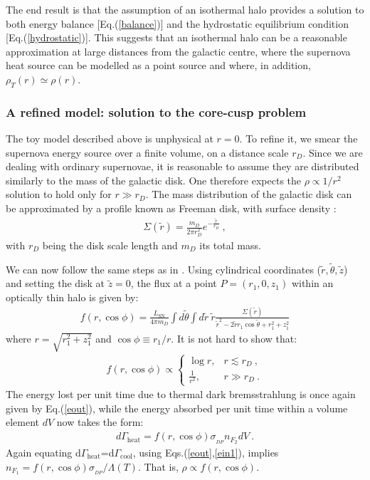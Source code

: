 \documentclass[12pt]{article}
\begin{document}
{{The end result is that the assumption of an isothermal halo provides a
solution to both energy balance [Eq.(\ref{balance})] and the hydrostatic
equilibrium condition [Eq.(\ref{hydrostatic})]. This suggests that an
isothermal halo can be a reasonable approximation at large distances
from the galactic centre, where the supernova heat source can be
modelled as a point source and where, in addition, $\rho _T (r) \simeq
\rho (r)$.

\subsubsection{A refined model: solution to the core-cusp problem}

The toy model described above is unphysical at $r = 0$. To refine it, we
smear the supernova energy source over a finite volume, on a distance
scale $r_D$. Since we are dealing with ordinary supernovae, it is
reasonable to assume they are distributed similarly to the mass of the
galactic disk. One therefore expects the $\rho \propto 1/r ^2$ solution
to hold only for $r \gg r _D$. The mass distribution of the galactic
disk can be approximated by a profile known as Freeman disk, with
surface density \cite{freeman}:
%
\begin{eqnarray}
\Sigma (\widetilde{r}) = \frac{m _D}{2\pi r_D ^2}e
^{-\frac{\widetilde{r}}{r_D}} \ ,
\end{eqnarray}
%
with $r_D$ being the disk scale length and $m _D$ its total mass. 

We can now follow the same steps as in \cite{review}. Using cylindrical
coordinates ($\widetilde{r},\widetilde{\theta},\widetilde{z}$) and
setting the disk at $\widetilde{z} = 0$, the flux at a point $P = (r
_1,0,z _1)$ within an optically thin halo is given by:
%
\begin{eqnarray}
f(r,\cos \phi ) = \frac{L _{\text{SN}}}{4\pi m _D} \int
d\widetilde{\theta} \int d\widetilde{r} \ \widetilde{r} \frac{\Sigma
(\widetilde{r})}{{\widetilde{r}} ^2 - 2\widetilde{r}r _1 \cos
\widetilde{\theta} + r _1 ^2 + z _1 ^2}
\end{eqnarray}
%
where $r = \sqrt{r _1 ^2 + z _1 ^2}$ and $\cos \phi \equiv r _1/r$. It
is not hard to show that:
%
\begin{eqnarray}
f(r,\cos \phi) \propto \begin{cases}
                  \log r, & r \lesssim r_D \ , \\
                  \frac{1}{r ^2}, & r \gg r_D \ .
                  \end{cases}
\label{frc}
\end{eqnarray}
%
The energy lost per unit time due to thermal dark bremsstrahlung is once
again given by Eq.(\ref{eout}), while the energy absorbed per unit time
within a volume element $dV$ now takes the form:
%
\begin{eqnarray}
d\Gamma _{\text{heat}} = f(r,\cos \phi)\sigma _{_{DP}}n _{F _2}dV \ .
\label{ein1}
\end{eqnarray}
%
Again equating d$\Gamma _{\text{heat}}$=d$\Gamma _{\text{cool}}$, using
Eqs.(\ref{eout},\ref{ein1}), implies $n _{F_1} = f(r,\cos \phi)\sigma
_{_{DP}}/\Lambda (T)$. That is, $\rho \propto f(r,\cos \phi )$. 


}}
\end{document}
